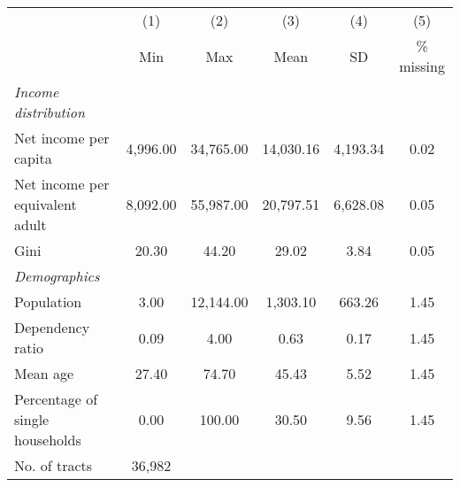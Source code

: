 
\begin{tabular}{@{}lccccc@{}}
\toprule
  & (1) & (2) & (3) &  (4) &  (5) \\
 & Min & Max & Mean & SD & \% missing\\
\midrule
\qquad \textit{Income distribution} \\
Net income per capita &  4,996.00 & 34,765.00 & 14,030.16 &  4,193.34 &      0.02\\
Net income per equivalent adult &  8,092.00 & 55,987.00 & 20,797.51 &  6,628.08 &      0.05\\
Gini &     20.30 &     44.20 &     29.02 &      3.84 &      0.05\\
\qquad \textit{Demographics} \\
Population &      3.00 & 12,144.00 &  1,303.10 &    663.26 &      1.45\\
Dependency ratio &      0.09 &      4.00 &      0.63 &      0.17 &      1.45\\
Mean age &     27.40 &     74.70 &     45.43 &      5.52 &      1.45\\
Percentage of single households &      0.00 &    100.00 &     30.50 &      9.56 &      1.45\\
\midrule
No. of tracts &          36,982 \\
\midrule
\end{tabular}
